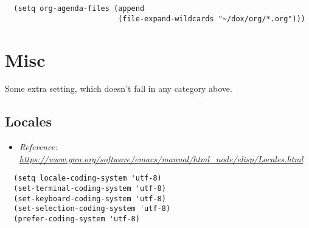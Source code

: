 \documentclass[11pt]{article}
\begin{document}
\begin{verbatim}
  (setq org-agenda-files (append
                          (file-expand-wildcards "~/dox/org/*.org")))
\end{verbatim}
\section{Misc}
\label{sec:org2967a67}
Some extra setting, which doesn't fall in any category above.
\subsection{Locales}
\label{sec:orgff712da}
\begin{itemize}
\item \emph{Reference: \url{https://www.gnu.org/software/emacs/manual/html\_node/elisp/Locales.html}}
\end{itemize}
\begin{verbatim}
  (setq locale-coding-system 'utf-8)
  (set-terminal-coding-system 'utf-8)
  (set-keyboard-coding-system 'utf-8)
  (set-selection-coding-system 'utf-8)
  (prefer-coding-system 'utf-8)
\end{verbatim}
\end{document}
